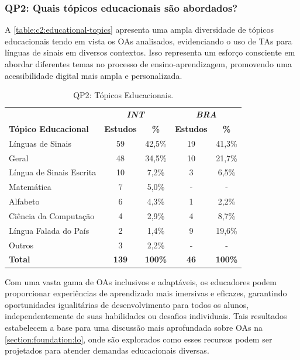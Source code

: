 \subsubsection{QP2: Quais tópicos educacionais são abordados?}

A \autoref{table:c2:educational-topics} apresenta uma ampla diversidade de tópicos educacionais tendo em vista os OAs analisados, evidenciando o uso de TAs para línguas de sinais em diversos contextos. Isso representa um esforço consciente em abordar diferentes temas no processo de ensino-aprendizagem, promovendo uma acessibilidade digital mais ampla e personalizada. 

\begin{table}[htb]
\caption{QP2: Tópicos Educacionais.}
\label{table:c2:educational-topics}
\centering
\begin{tabular}{l|cc|cc} \hline
 & \multicolumn{2}{c|}{\textit{\textbf{INT}}} & \multicolumn{2}{c}{\textit{\textbf{BRA}}} \\ \cline{2-5} 
\textbf{Tópico Educacional} & \textbf{Estudos} & \textbf{\%} & \textbf{Estudos} & \textbf{\%} \\ \hline
Línguas de Sinais & 59 & 42,5\% & 19 & 41,3\% \\
Geral & 48 & 34,5\% & 10 & 21,7\% \\
Língua de Sinais Escrita & 10 & 7,2\% & 3 & 6,5\% \\
Matemática & 7 & 5,0\% & - & - \\
Alfabeto & 6 & 4,3\% & 1 & 2,2\% \\
Ciência da Computação & 4 & 2,9\% & 4 & 8,7\% \\
Língua Falada do País & 2 & 1,4\% & 9 & 19,6\% \\
Outros & 3 & 2,2\% & - & - \\ \hline
\textbf{Total} & \textbf{139} & \textbf{100\%} & \textbf{46} & \textbf{100\%} \\ \hline
\end{tabular}
\end{table}

Com uma vasta gama de OAs inclusivos e adaptáveis, os educadores podem proporcionar experiências de aprendizado mais imersivas e eficazes, garantindo oportunidades igualitárias de desenvolvimento para todos os alunos, independentemente de suas habilidades ou desafios individuais. Tais resultados estabelecem a base para uma discussão mais aprofundada sobre OAs na \autoref{section:foundation:lo}, onde são explorados como esses recursos podem ser projetados para atender demandas educacionais diversas.

